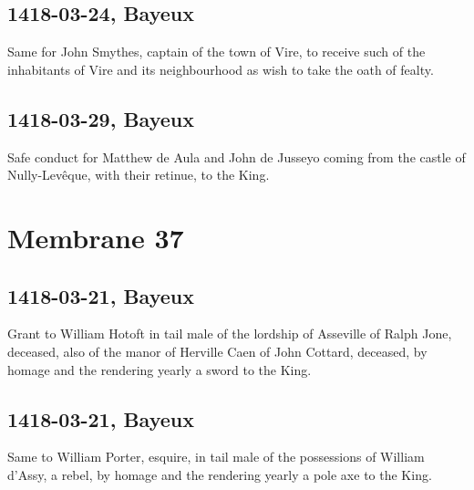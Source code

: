\documentclass[a4paper,12pt,twoside]{book}
\begin{document}
                
                \subsection{1418-03-24, Bayeux}
                
                
                     Same for John Smythes, captain of the town of Vire, to receive such of the inhabitants of Vire and its neighbourhood as wish to take the oath of fealty.
                  
                
                \subsection{1418-03-29, Bayeux}
                
                
                     Safe conduct for Matthew de Aula and John de Jusseyo coming from the castle of Nully-Levêque, with their retinue, to the King.
                  
                \newpage
            
            
            \section{Membrane 37}
            
            
                
                \subsection{1418-03-21, Bayeux}
                
                
                  Grant to William Hotoft in tail male of the lordship of Asseville of Ralph Jone, deceased, also of the manor of Herville Caen of John Cottard, deceased, by homage and the rendering yearly a sword to the King.
               
                
                \subsection{1418-03-21, Bayeux}
                
                
                  Same to William Porter, esquire, in tail male of the possessions of William d'Assy, a rebel, by homage and the rendering yearly a pole axe to the King.
               
\end{document}
